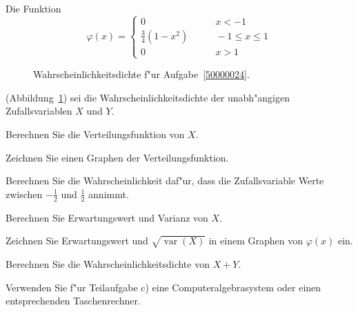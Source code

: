 Die Funktion
\[
\varphi(x)=\begin{cases}
0&\qquad x< -1\\
\frac34(1-x^2)&\qquad -1\le x\le 1\\
0&\qquad x > 1
\end{cases}
\]
\begin{figure}[h]
\centering
{}
\caption{Wahrscheinlichkeitsdichte f"ur Aufgabe~\ref{50000024}.
\label{50000024:dichte}}
\end{figure}
(Abbildung~\ref{50000024:dichte})
sei die Wahrscheinlichkeitsdichte der unabh"angigen Zufallsvariablen
$X$ und $Y$.
\begin{teilaufgaben}
\item Berechnen Sie die Verteilungsfunktion von $X$.
\item Zeichnen Sie einen Graphen der Verteilungsfunktion.
\item Berechnen Sie die Wahrscheinlichkeit daf"ur, dass die Zufallsvariable
Werte zwischen $-\frac12$ und $\frac12$ annimmt.
\item Berechnen Sie Erwartungswert und Varianz von $X$.
\item Zeichnen Sie Erwartungswert und $\sqrt{\operatorname{var}(X)}$ in
einem Graphen von $\varphi(x)$ ein.
\item Berechnen Sie die Wahrscheinlichkeitsdichte von $X+Y$.
\end{teilaufgaben}

\begin{hinweis}
Verwenden Sie f"ur Teilaufgabe c) eine Computeralgebrasystem oder einen
entsprechenden Taschenrechner.
\end{hinweis}

